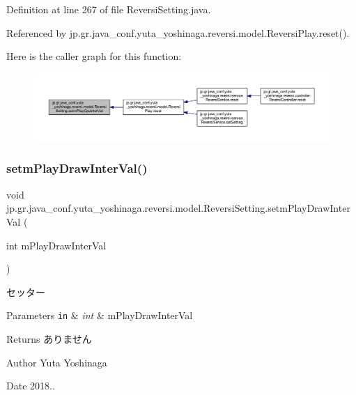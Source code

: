 Definition at line 267 of file Reversi\+Setting.\+java.



Referenced by jp.\+gr.\+java\+\_\+conf.\+yuta\+\_\+yoshinaga.\+reversi.\+model.\+Reversi\+Play.\+reset().

Here is the caller graph for this function\+:
\nopagebreak
\begin{figure}[H]
\begin{center}
\leavevmode
\includegraphics[width=350pt]{classjp_1_1gr_1_1java__conf_1_1yuta__yoshinaga_1_1reversi_1_1model_1_1_reversi_setting_ae2c0f9f922618dfaf5da9050362dcb2d_icgraph}
\end{center}
\end{figure}
\mbox{\label{classjp_1_1gr_1_1java__conf_1_1yuta__yoshinaga_1_1reversi_1_1model_1_1_reversi_setting_aae2b022804d0828d000bdb09d247c82d}} 
\subsubsection{\texorpdfstring{setm\+Play\+Draw\+Inter\+Val()}{setmPlayDrawInterVal()}}
{\footnotesize\ttfamily void jp.\+gr.\+java\+\_\+conf.\+yuta\+\_\+yoshinaga.\+reversi.\+model.\+Reversi\+Setting.\+setm\+Play\+Draw\+Inter\+Val (\begin{DoxyParamCaption}\item[{int}]{m\+Play\+Draw\+Inter\+Val }\end{DoxyParamCaption})}



セッター 


\begin{DoxyParams}[1]{Parameters}
\mbox{\tt in}  & {\em int} & m\+Play\+Draw\+Inter\+Val \\
\hline
\end{DoxyParams}
\begin{DoxyReturn}{Returns}
ありません 
\end{DoxyReturn}
\begin{DoxyAuthor}{Author}
Yuta Yoshinaga 
\end{DoxyAuthor}
\begin{DoxyDate}{Date}
2018.. 
\end{DoxyDate}


